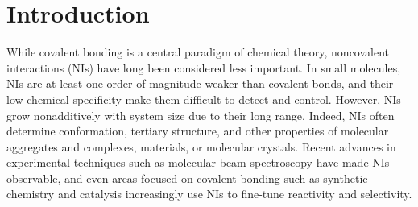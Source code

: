 \documentclass[twoside,twocolumn,9pt]{article}
\begin{document}

\section{Introduction}

While covalent bonding is a central paradigm of chemical theory,
noncovalent interactions
(NIs)\cite{HobzaCollectCzechChemCommun, Dobson12JPhysCondensMatter24p073201}
have long been 
considered less important. In small molecules, NIs are at least one
order of magnitude weaker than covalent bonds, and their low chemical
specificity make them difficult to detect and control. However, NIs
grow nonadditively with system size due to their long
range.\cite{DobsonIntJQuantumChem} 
Indeed, NIs often determine conformation, tertiary 
structure, and other properties of molecular
aggregates and complexes,\cite{Huang16Langmuir32p12352,
  Biedermann16ChemRev116p5216, Britz06ChemSocRev35p637}
materials,\cite{Liu13AdvMater25p1521, Georgakilas16ChemRev116p5464}
or molecular crystals.\cite{Moulton01ChemRev101p1629, 
  Beran16ChemRev116p5567}
Recent advances in experimental techniques such as molecular beam
spectroscopy\cite{Becucci16ChemRev116p5014}
have made NIs observable, and even areas focused on 
covalent bonding such as synthetic chemistry and catalysis
increasingly use NIs to fine-tune reactivity and selectivity.
\cite{Zuend09JAmChemSoc131p15358, Tao16ChemEurJ22p8786}
\end{document}
